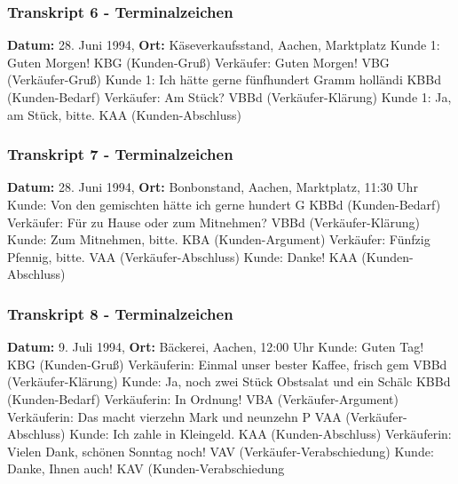 \documentclass[
]{article}
\begin{document}
\subsubsection{\texorpdfstring{\textbf{Transkript 6 -
Terminalzeichen}}{Transkript 6 - Terminalzeichen}}\label{transkript-6---terminalzeichen-1}

\textbf{Datum:} 28. Juni 1994, \textbf{Ort:} Käseverkaufsstand, Aachen,
Marktplatz\textbar{} Kunde 1: Guten Morgen! \textbar{} KBG (Kunden-Gruß)
\textbar{} Verkäufer: Guten Morgen! \textbar{} VBG (Verkäufer-Gruß)
\textbar{} Kunde 1: Ich hätte gerne fünfhundert Gramm holländi\textbar{}
KBBd (Kunden-Bedarf) \textbar{} Verkäufer: Am Stück? \textbar{} VBBd
(Verkäufer-Klärung) \textbar{} Kunde 1: Ja, am Stück, bitte. \textbar{}
KAA (Kunden-Abschluss)

\subsubsection{\texorpdfstring{\textbf{Transkript 7 -
Terminalzeichen}}{Transkript 7 - Terminalzeichen}}\label{transkript-7---terminalzeichen-1}

\textbf{Datum:} 28. Juni 1994, \textbf{Ort:} Bonbonstand, Aachen,
Marktplatz, 11:30 Uhr\textbar{} Kunde: Von den gemischten hätte ich
gerne hundert G\textbar{} KBBd (Kunden-Bedarf) \textbar{} Verkäufer: Für
zu Hause oder zum Mitnehmen? \textbar{} VBBd (Verkäufer-Klärung)
\textbar{} Kunde: Zum Mitnehmen, bitte. \textbar{} KBA (Kunden-Argument)
\textbar{} Verkäufer: Fünfzig Pfennig, bitte. \textbar{} VAA
(Verkäufer-Abschluss) \textbar{} Kunde: Danke! \textbar{} KAA
(Kunden-Abschluss)

\subsubsection{\texorpdfstring{\textbf{Transkript 8 -
Terminalzeichen}}{Transkript 8 - Terminalzeichen}}\label{transkript-8---terminalzeichen-1}

\textbf{Datum:} 9. Juli 1994, \textbf{Ort:} Bäckerei, Aachen, 12:00
Uhr\textbar{} Kunde: Guten Tag! \textbar{} KBG (Kunden-Gruß) \textbar{}
Verkäuferin: Einmal unser bester Kaffee, frisch gem\textbar{} VBBd
(Verkäufer-Klärung) \textbar{} Kunde: Ja, noch zwei Stück Obstsalat und
ein Schälc\textbar{} KBBd (Kunden-Bedarf) \textbar{} Verkäuferin: In
Ordnung! \textbar{} VBA (Verkäufer-Argument) \textbar{} Verkäuferin: Das
macht vierzehn Mark und neunzehn P\textbar{} VAA (Verkäufer-Abschluss)
\textbar{} Kunde: Ich zahle in Kleingeld. \textbar{} KAA
(Kunden-Abschluss) \textbar{} Verkäuferin: Vielen Dank, schönen Sonntag
noch! \textbar{} VAV (Verkäufer-Verabschiedung) \textbar{} Kunde: Danke,
Ihnen auch! \textbar{} KAV (Kunden-Verabschiedung
\end{document}
